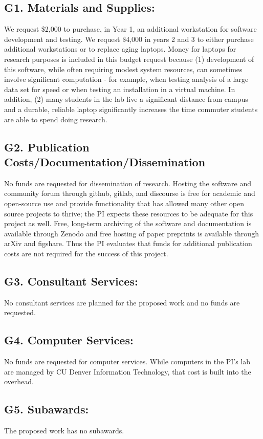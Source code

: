 \documentclass[11pt,oneside]{memoir}
\begin{document}
\subsection*{G1. Materials and Supplies:}
We request \$2,000 to purchase, in Year 1, an additional workstation for software development and testing. We request \$4,000 in years 2 and 3 to either purchase additional workstations or to replace aging laptops.  Money for laptops for research purposes is included in this budget request because (1) development of this software, while often requiring modest system resources, can sometimes involve significant computation - for example, when testing analysis of a large data set for speed or when testing an installation in a virtual machine.  In addition, (2) many students in the lab live a significant distance from campus and a durable, reliable laptop significantly increases the time commuter students are able to spend doing research.

\subsection*{G2. Publication Costs/Documentation/Dissemination}
No funds are requested for dissemination of research.  Hosting the software and community forum through github, gitlab, and discourse is free for academic and open-source use and provide functionality that has allowed many other open source projects to thrive; the PI expects these resources to be adequate for this project as well.  Free, long-term archiving of the software and documentation is available through Zenodo and free hosting of paper preprints is available through arXiv and figshare.  Thus the PI evaluates that funds for additional publication costs are not required for the success of this project.

\subsection*{G3. Consultant Services:}
No consultant services are planned for the proposed work and no funds are requested.

\subsection*{G4. Computer Services:}
No funds are requested for computer services.  While computers in the PI's lab are managed by CU Denver Information Technology, that cost is built into the overhead.

\subsection*{G5. Subawards:}
The proposed work has no subawards.
\end{document}
